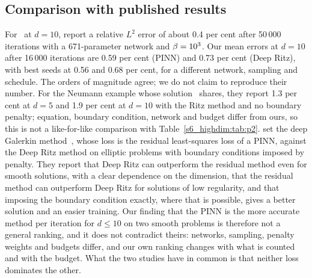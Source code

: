 \subsection{Comparison with published results}\label{s6_highdim:sec:limits}

For \Pone\ at $d=10$, \citet{eyu2018} report a relative $L^2$ error of about 0.4 per cent after
50\,000 iterations with a 671-parameter network and $\beta=10^3$. Our mean errors at $d=10$ after
16\,000 iterations are 0.59 per cent (PINN) and 0.73 per cent (Deep Ritz), with best seeds at 0.56
and 0.68 per cent, for a different network, sampling and schedule. The orders of magnitude agree;
we do not claim to reproduce their number. For the Neumann example whose solution \Ptwo\ shares,
they report 1.3 per cent at $d=5$ and 1.9 per cent at $d=10$ with the Ritz method and no boundary
penalty; equation, boundary condition, network and budget differ from ours, so this is not a
like-for-like comparison with Table~\ref{s6_highdim:tab:p2}.
\citet{chen2020comparison} set the deep Galerkin method~\citep{sirignano2018}, whose loss is the
residual least-squares loss of a PINN, against the Deep Ritz method on elliptic problems with
boundary conditions imposed by penalty. They report that Deep Ritz can outperform the residual
method even for smooth solutions, with a clear dependence on the dimension, that the residual
method can outperform Deep Ritz for solutions of low regularity, and that imposing the boundary
condition exactly, where that is possible, gives a better solution and an easier training. Our
finding that the PINN is the more accurate method per iteration for $d\le10$ on two smooth
problems is therefore not a general ranking, and it does not contradict theirs: networks,
sampling, penalty weights and budgets differ, and our own ranking changes with what is counted
and with the budget. What the two studies have in common is that neither loss dominates the
other.
